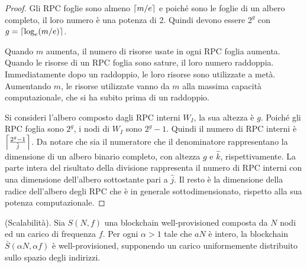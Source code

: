 \begin{proof}
Gli RPC foglie sono almeno $\ceil*{m/e}$ e poiché sono le foglie di un albero completo, il loro numero è una potenza di 2. Quindi devono essere $2^g$ con $g = \ceil*{\log_e (m/e)}$.

Quando $m$ aumenta, il numero di risorse usate in ogni RPC foglia aumenta. Quando le risorse di un RPC foglia sono sature, il loro numero raddoppia. Immediatamente dopo un raddoppio, le loro risorse sono utilizzate a metà. Aumentando $m$, le risorse utilizzate vanno da $m$ alla massima capacità computazionale, che si ha subito prima di un raddoppio.

Si consideri l'albero composto dagli RPC interni $W_I$, la sua altezza è $g$. Poiché gli RPC foglia sono $2^g$, i nodi di $W_I$ sono $2^g -1$. Quindi il numero di RPC interni è $\ceil*{\frac{2^g-1}{\hat{j}}}$.
Da notare che sia il numeratore che il denominatore rappresentano la dimensione di un albero binario completo, con altezza $g$ e $\hat{k}$, rispettivamente. La parte intera del risultato della divisione rappresenta il numero di RPC interni con una dimensione dell'albero sottostante pari a $\hat{j}$. Il resto  è la dimensione della radice dell'albero degli RPC che è in generale sottodimensionato, rispetto alla sua potenza computazionale.
\end{proof}


\begin{theorem}{(Scalabilità).}\label{th:scalability}
Sia $S(N, f)$ una blockchain well-provisioned composta da $N$ nodi ed un carico di frequenza $f$. Per ogni $\alpha > 1$ tale che $a N$ è intero, la blockchain $\bar{S}(\alpha N, \alpha f)$ è well-provisioned, supponendo un carico uniformemente distribuito sullo spazio degli indirizzi.
\end{theorem}

